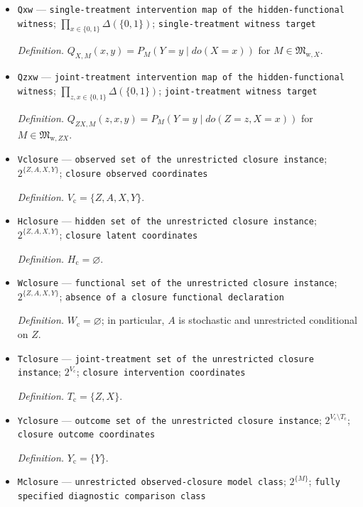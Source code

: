 \documentclass{article}
\begin{document}
\begin{itemize}
  \item \texttt{Qxw} --- \texttt{single-\allowbreak{}treatment intervention map of the hidden-\allowbreak{}functional witness}; \(\prod_{x\in\{0,1\}}\Delta(\{0,1\})\); \texttt{single-\allowbreak{}treatment witness target}
  \par\smallskip\noindent\emph{Definition.} \(Q_{X,M}(x,y)=P_M(Y=y\mid do(X=x))\) for \(M\in\mathfrak M_{\mathrm w,X}\).
  \item \texttt{Qzxw} --- \texttt{joint-\allowbreak{}treatment intervention map of the hidden-\allowbreak{}functional witness}; \(\prod_{z,x\in\{0,1\}}\Delta(\{0,1\})\); \texttt{joint-\allowbreak{}treatment witness target}
  \par\smallskip\noindent\emph{Definition.} \(Q_{ZX,M}(z,x,y)=P_M(Y=y\mid do(Z=z,X=x))\) for \(M\in\mathfrak M_{\mathrm w,ZX}\).
  \item \texttt{Vclosure} --- \texttt{observed set of the unrestricted closure instance}; \(2^{\{Z,A,X,Y\}}\); \texttt{closure observed coordinates}
  \par\smallskip\noindent\emph{Definition.} \(V_{\mathrm c}=\{Z,A,X,Y\}\).
  \item \texttt{Hclosure} --- \texttt{hidden set of the unrestricted closure instance}; \(2^{\{Z,A,X,Y\}}\); \texttt{closure latent coordinates}
  \par\smallskip\noindent\emph{Definition.} \(H_{\mathrm c}=\varnothing\).
  \item \texttt{Wclosure} --- \texttt{functional set of the unrestricted closure instance}; \(2^{\{Z,A,X,Y\}}\); \texttt{absence of a closure functional declaration}
  \par\smallskip\noindent\emph{Definition.} \(W_{\mathrm c}=\varnothing\); in particular, \(A\) is stochastic and unrestricted conditional on \(Z\).
  \item \texttt{Tclosure} --- \texttt{joint-\allowbreak{}treatment set of the unrestricted closure instance}; \(2^{V_{\mathrm c}}\); \texttt{closure intervention coordinates}
  \par\smallskip\noindent\emph{Definition.} \(T_{\mathrm c}=\{Z,X\}\).
  \item \texttt{Yclosure} --- \texttt{outcome set of the unrestricted closure instance}; \(2^{V_{\mathrm c}\setminus T_{\mathrm c}}\); \texttt{closure outcome coordinates}
  \par\smallskip\noindent\emph{Definition.} \(Y_{\mathrm c}=\{Y\}\).
  \item \texttt{Mclosure} --- \texttt{unrestricted observed-\allowbreak{}closure model class}; \(2^{\{M\}}\); \texttt{fully specified diagnostic comparison class}

\end{itemize}
\end{document}

